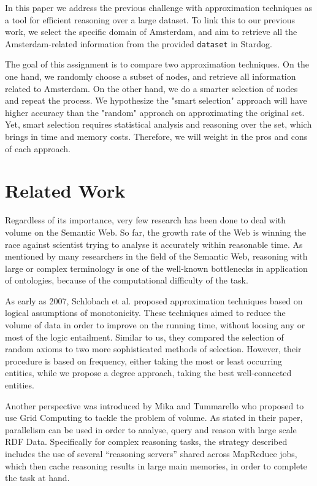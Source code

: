 \documentclass[runningheads,a4paper]{../../StyleFiles/llncs}
\begin{document}
In this paper we address the previous challenge with approximation techniques as a tool for efficient reasoning over a large dataset. To link this to our previous work, we select the specific domain of Amsterdam, and aim to retrieve all the Amsterdam-related information from the provided \texttt{dataset} in Stardog.  

The goal of this assignment is to compare two approximation techniques. On the one hand, we randomly choose a subset of nodes, and retrieve all information related to Amsterdam. On the other hand, we do a smarter selection of nodes and repeat the process. We hypothesize the "smart selection" approach will have higher accuracy than the "random" approach on approximating the original set. Yet, smart selection requires statistical analysis and reasoning over the set, which brings in time and memory costs. Therefore, we will weight in the pros and cons of each approach.

\section{Related Work}
Regardless of its importance, very few research has been done to deal with volume on the Semantic Web. So far, the growth rate of the Web is winning the race against scientist trying to analyse it accurately within reasonable time. As mentioned by many researchers in the field of the Semantic Web, reasoning with large or complex terminology is one of the well-known bottlenecks in application of ontologies, because of the computational difficulty of the task.

As early as 2007, Schlobach et al. \cite{schlobach2007anytime} proposed approximation techniques based on logical assumptions of monotonicity. These techniques aimed to reduce the volume of data in order to improve on the running time, without loosing any or most of the logic entailment. Similar to us, they compared the selection of random axioms to two more sophisticated methods of selection. However, their procedure is based on frequency, either taking the most or least occurring entities, while we propose a degree approach, taking the best well-connected entities.

Another perspective was introduced by Mika and Tummarello \cite{mika2008web} who proposed to use Grid Computing to tackle the problem of volume. As stated in their paper, parallelism can be used in order to analyse, query and reason with large scale RDF Data. Specifically for complex reasoning tasks, the strategy described includes the use of several “reasoning servers” shared across MapReduce jobs, which then cache reasoning results in large main memories, in order to complete the task at hand.
\end{document}
